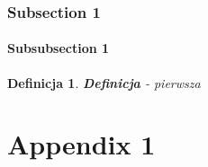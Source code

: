 \documentclass[twoside]{iisthesis}
\newtheorem{mydef}{Definicja}
\begin{document}
\subsection{Subsection 1}

\subsubsection{Subsubsection 1}

\begin{mydef}
\textbf{Definicja} - pierwsza
\end{mydef}



 \clearpage
\appendix
\chapter{Appendix 1}


\clearpage
\pagestyle{plain}
\listofmyfigure
\listofmyequations
\listofmyalgorithm
\clearpage




\end{document}
